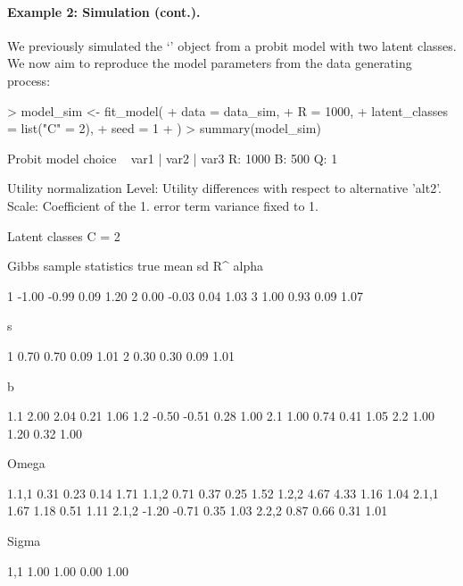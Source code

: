 \documentclass[article]{jss}
\newcommand{\class}[1]{`\code{#1}'}
\begin{document}
\paragraph{Example 2: Simulation (cont.).}

We previously simulated the \class{RprobitB\_data} object  from a probit model with two latent classes. We now aim to reproduce the model parameters from the data generating process:

\begin{Schunk}
\begin{Sinput}
> model_sim <- fit_model(
+    data = data_sim,
+    R = 1000,
+    latent_classes = list("C" = 2),
+    seed = 1
+  )
> summary(model_sim)
\end{Sinput}
\begin{Soutput}
Probit model
choice ~ var1 | var2 | var3 
R: 1000 
B: 500 
Q: 1 

Utility normalization
Level: Utility differences with respect to alternative 'alt2'.
Scale: Coefficient of the 1. error term variance fixed to 1.

Latent classes
C = 2 

Gibbs sample statistics
          true    mean      sd      R^
 alpha
                                      
     1   -1.00   -0.99    0.09    1.20
     2    0.00   -0.03    0.04    1.03
     3    1.00    0.93    0.09    1.07

 s
                                      
     1    0.70    0.70    0.09    1.01
     2    0.30    0.30    0.09    1.01

 b
                                      
   1.1    2.00    2.04    0.21    1.06
   1.2   -0.50   -0.51    0.28    1.00
   2.1    1.00    0.74    0.41    1.05
   2.2    1.00    1.20    0.32    1.00

 Omega
                                      
 1.1,1    0.31    0.23    0.14    1.71
 1.1,2    0.71    0.37    0.25    1.52
 1.2,2    4.67    4.33    1.16    1.04
 2.1,1    1.67    1.18    0.51    1.11
 2.1,2   -1.20   -0.71    0.35    1.03
 2.2,2    0.87    0.66    0.31    1.01

 Sigma
                                      
   1,1    1.00    1.00    0.00    1.00
\end{Soutput}
\end{Schunk}
\end{document}
